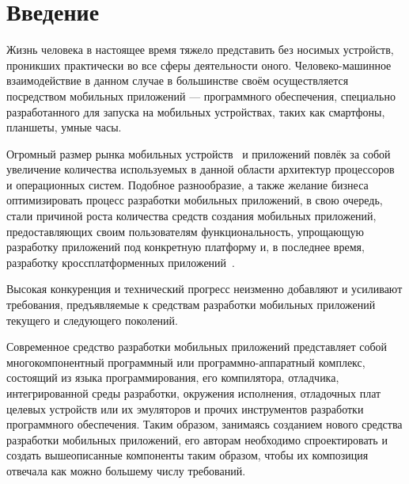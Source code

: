 \section*{Введение}
Жизнь человека в настоящее время тяжело представить без носимых устройств,
проникших практически во все сферы деятельности оного.
Человеко-машинное взаимодействие в данном случае в большинстве своём
осуществляется посредством мобильных приложений --- программного
обеспечения, специально разработанного для запуска на мобильных устройствах,
таких как смартфоны, планшеты, умные часы.

Огромный размер рынка мобильных устройств~\cite{device-market-stat} и
приложений повлёк за собой увеличение количества используемых в данной области
архитектур процессоров~\cite{cpu-arches, mobile-phones-cpu-trends} и
операционных систем. Подобное разнообразие, а также желание бизнеса
оптимизировать процесс разработки мобильных приложений, в свою очередь,
стали причиной роста количества средств создания мобильных
приложений, предоставляющих своим пользователям функциональность,
упрощающую разработку приложений под конкретную платформу и, в последнее
время, разработку кроссплатформенных приложений~\cite{mob-apps-approaches,kotlin-homepage,swift-homepage,flutter-homepage,
reactnative-homepage, vuenative-homepage}.

Высокая конкуренция и технический прогресс неизменно добавляют
и усиливают требования, предъявляемые к средствам разработки мобильных
приложений текущего и следующего поколений.

Современное средство разработки мобильных приложений представляет собой
многокомпонентный программный или программно-аппарат\-ный комплекс, состоящий
из языка программирования, его компилятора, отладчика, интегрированной
среды разработки, окружения исполнения, отладочных плат целевых устройств
или их эмуляторов и прочих инструментов разработки программного обеспечения.
Таким образом, занимаясь созданием нового средства разработки мобильных
приложений, его авторам необходимо спроектировать и создать вышеописанные
компоненты таким образом, чтобы их композиция отвечала как можно большему
числу требований.



